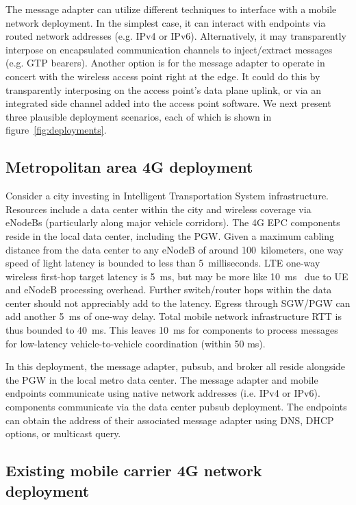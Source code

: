 The message adapter can utilize different techniques to interface with
a mobile network deployment. In the simplest case, it can interact
with endpoints via routed network addresses (e.g. IPv4 or
IPv6). Alternatively, it may transparently interpose on encapsulated
communication channels to inject/extract messages (e.g. GTP
bearers). Another option is for the message adapter to operate in
concert with the wireless access point right at the edge. It could do
this by transparently interposing on the access point's data plane
uplink, or via an integrated side channel added into the access point
software.  We next present three plausible deployment scenarios, each
of which is shown in figure~\ref{fig:deployments}.

\subsection{Metropolitan area 4G deployment}
\label{sec:metro-deploy}

Consider a city investing in Intelligent Transportation System
infrastructure. Resources include a data center within the city and
wireless coverage via eNodeBs (particularly along major vehicle
corridors). The 4G EPC components reside in the local data center,
including the PGW.  Given a maximum cabling distance from the data
center to any eNodeB of around 100~kilometers, one way speed of light
latency is bounded to less than 5~milliseconds.  LTE one-way wireless
first-hop target latency is 5~ms, but may be more like
10~ms~\cite{laner2012comparison} due to UE and eNodeB processing overhead.
Further switch/router hops within the data center should not
appreciably add to the latency. Egress through SGW/PGW can add another
5~ms of one-way delay.  Total mobile network
infrastructure RTT is thus bounded to 40~ms. This leaves 10~ms for
\name components to process messages for low-latency
vehicle-to-vehicle coordination (within 50 ms).

In this deployment, the \name message adapter, pubsub, and broker
all reside alongside the PGW in the local metro data center. The
message adapter and mobile endpoints communicate using native network
addresses (i.e. IPv4 or IPv6).  \name components communicate via the
data center pubsub deployment. The endpoints can obtain the address
of their associated message adapter using DNS, DHCP options, or
multicast query.

\subsection{Existing mobile carrier 4G network deployment}

